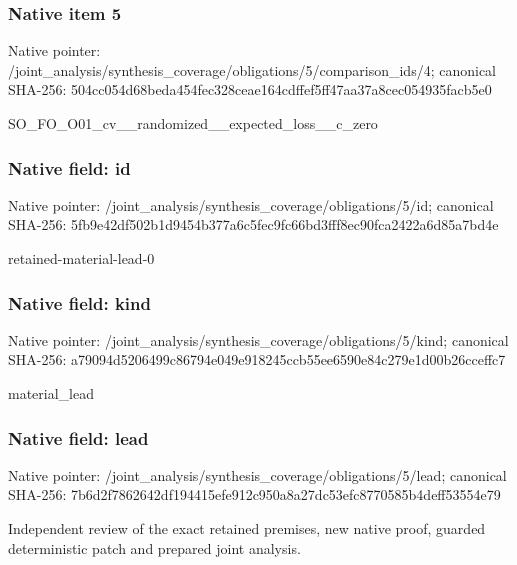 \documentclass[10pt,a4paper]{article}
\begin{document}
\subsubsection{Native item 5}
Native pointer: /joint\_\allowbreak{}analysis/synthesis\_\allowbreak{}coverage/obligations/5/comparison\_\allowbreak{}ids/4; canonical SHA-256: 504cc054d68beda454fec328ceae164cdffef5ff47aa37a8cec054935facb5e0

\begingroup\raggedright\sloppy SO\_\allowbreak{}FO\_\allowbreak{}O01\_\allowbreak{}cv\_\allowbreak{}\_\allowbreak{}randomized\_\allowbreak{}\_\allowbreak{}expected\_\allowbreak{}loss\_\allowbreak{}\_\allowbreak{}c\_\allowbreak{}zero\par\endgroup

\subsubsection{Native field: id}
Native pointer: /joint\_\allowbreak{}analysis/synthesis\_\allowbreak{}coverage/obligations/5/id; canonical SHA-256: 5fb9e42df502b1d9454b377a6c5fec9fc66bd3fff8ec90fca2422a6d85a7bd4e

\begingroup\raggedright\sloppy retained-material-lead-0\par\endgroup

\subsubsection{Native field: kind}
Native pointer: /joint\_\allowbreak{}analysis/synthesis\_\allowbreak{}coverage/obligations/5/kind; canonical SHA-256: a79094d5206499c86794e049e918245ccb55ee6590e84c279e1d00b26cceffc7

\begingroup\raggedright\sloppy material\_\allowbreak{}lead\par\endgroup

\subsubsection{Native field: lead}
Native pointer: /joint\_\allowbreak{}analysis/synthesis\_\allowbreak{}coverage/obligations/5/lead; canonical SHA-256: 7b6d2f7862642df194415efe912c950a8a27dc53efc8770585b4deff53554e79

\begingroup\raggedright\sloppy Independent review of the exact retained premises,\allowbreak{} new native proof,\allowbreak{} guarded deterministic patch and prepared joint analysis.\par\endgroup
\end{document}
